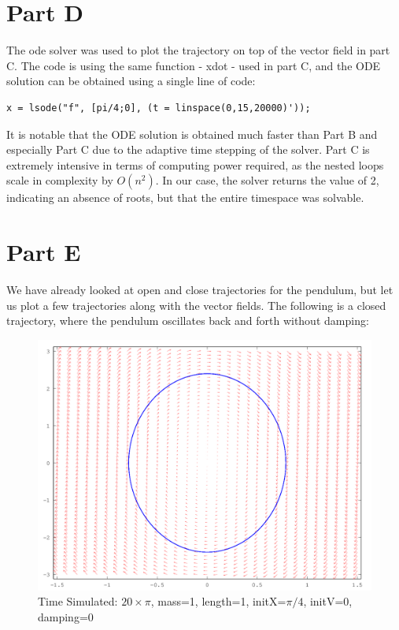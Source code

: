 \documentclass{article}
\begin{document}
\newpage
\section{Part D}
The ode solver was used to plot the trajectory on top of the vector field in part C. The code is using the same function - xdot - used in part C, and the ODE solution can be obtained using a single line of code:

\begin{lstlisting}
x = lsode("f", [pi/4;0], (t = linspace(0,15,20000)'));
\end{lstlisting}
\newline
It is notable that the ODE solution is obtained much faster than Part B and especially Part C due to the adaptive time stepping of the solver. Part C is extremely intensive in terms of computing power required, as the nested loops scale in complexity by $O(n^2)$. In our case, the solver returns the value of 2, indicating an absence of roots, but that the entire timespace was solvable.

\section{Part E}
We have already looked at open and close trajectories for the pendulum, but let us plot a few trajectories along with the vector fields. The following is a closed trajectory, where the pendulum oscillates back and forth without damping:

\begin{figure}[H]
\caption{Time Simulated: $20\times\pi$, mass=1, length=1, initX=$\pi / 4$, initV=0, damping=0}
\includegraphics[width=\textwidth]{plot9}
\end{figure}
\end{document}
